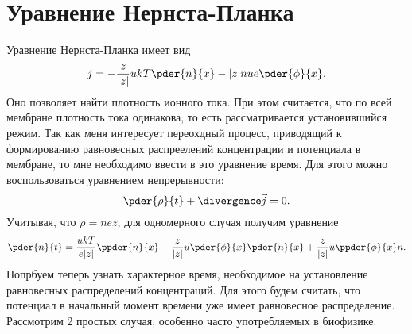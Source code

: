 \documentclass{hedwork}
\begin{document}
\tableofcontents
\section{Уравнение Нернста-Планка}
    Уравнение Нернста-Планка имеет вид
    \begin{equation}
        j = -\frac{z}{|z|}ukT\pder{n}{x} - |z|nue\pder{\phi}{x}.
        \label{eq:nernst-plank}
    \end{equation}
    Оно позволяет найти плотность ионного тока. При этом считается, что по всей
    мембране плотность тока одинакова, то есть рассматривается установившийся
    режим. Так как меня интересует переохдный процесс, приводящий к формированию
    равновесных распреелений концентрации и потенциала в мембране, то мне
    необходимо ввести в это уравнение время. Для этого можно воспользоваться
    уравнением непрерывности:
    \begin{equation}
        \pder{\rho}{t} + \divergence\vec{j} = 0.
    \end{equation}
    Учитывая, что \( \rho = nez \), для одномерного случая получим уравнение
    \begin{equation}
        \pder{n}{t} = \frac{ukT}{e|z|}\ppder{n}{x} +
            \frac{z}{|z|}u\pder{\phi}{x}\pder{n}{x} +
            \frac{z}{|z|}u\ppder{\phi}{x}n.
        \label{eq:nernst-plank_with_time}
    \end{equation}
    Попрбуем теперь узнать характерное время, необходимое на установление
    равновесных распределений концентраций. Для этого будем считать, что
    потенциал в начальный момент времени уже имеет равновесное
    распределение. Рассмотрим 2 простых случая, особенно часто употребляемых в
    биофизике:
\end{document}
